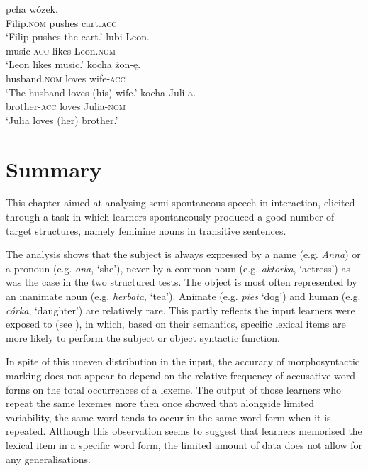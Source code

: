 \ea%
    \label{ex:07:11}
    \ea\label{ex:07:11a}
        {pcha}    {wózek}.\\
            Filip\textsc{.nom}  pushes  cart\textsc{.acc}\\
    \glt    ‘Filip pushes the cart.’
    \ex\label{ex:07:11b}
      {lubi}  {Leon}.\\
            music-\textsc{acc}  likes  Leon\textsc{.nom}\\
    \glt    ‘Leon likes music.’
    \ex\label{ex:07:11c}
          {kocha}  {żon-ę}.\\
            husband\textsc{.nom}  loves  wife-\textsc{acc}\\
    \glt    ‘The husband loves (his) wife.’
    \ex\label{ex:07:11d}
        {kocha}  {Juli-a}.\\
            brother-\textsc{acc}  loves  Julia-\textsc{nom}\\
    \glt    ‘Julia loves (her) brother.’
    \z
\z

\section{Summary}\label{sec:07:6}

This chapter aimed at analysing semi-spontaneous speech in interaction, elicited through a task in which learners spontaneously produced a good number of target structures, namely feminine nouns in transitive sentences.

The analysis shows that the subject is always expressed by a name (e.g. \textit{Anna}) or a pronoun (e.g. \textit{ona}, ‘she’), never by a common noun (e.g. \textit{aktorka}, ‘actress’) as was the case in the two structured tests. The object is most often represented by an inanimate noun (e.g. \textit{herbata}, ‘tea’). Animate (e.g. \textit{pies} ‘dog’) and human (e.g. \textit{córka}, ‘daughter’) are relatively rare. This partly reflects the input learners were exposed to (see ), in which, based on their semantics, specific lexical items are more likely to perform the subject or object syntactic function.

In spite of this uneven distribution in the input, the accuracy of morphosyntactic marking does not appear to depend on the relative frequency of accusative word forms on the total occurrences of a lexeme. The output of those learners who repeat the same lexemes more then once showed that alongside limited variability, the same word tends to occur in the same word-form when it is repeated. Although this observation seems to suggest that learners memorised the lexical item in a specific word form, the limited amount of data does not allow for any generalisations.

